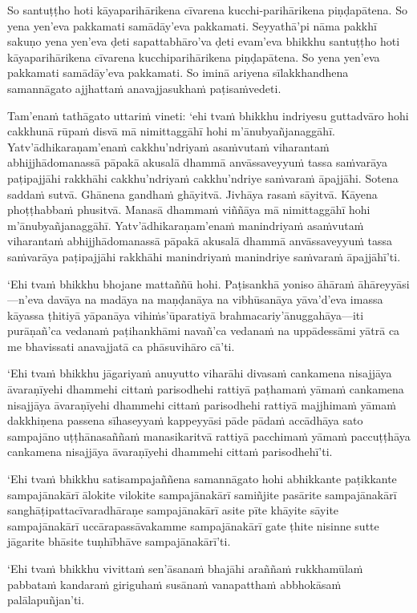 So santuṭṭho hoti kāyaparihārikena cīvarena kucchi-parihārikena piṇḍapātena. So yena yen'eva pakkamati samādāy'eva pakkamati. Seyyathā'pi nāma pakkhī sakuṇo yena yen'eva ḍeti sapattabhāro'va ḍeti evam'eva bhikkhu santuṭṭho hoti kāyaparihārikena cīvarena kucchiparihārikena piṇḍapātena. So yena yen'eva pakkamati samādāy'eva pakkamati. So iminā ariyena sīlakkhandhena samannāgato ajjhattaṁ anavajjasukhaṁ paṭisaṁvedeti.

\suttaRef{[MN 51]}

Tam'enaṁ tathāgato uttariṁ vineti: `ehi tvaṁ bhikkhu indriyesu guttadvāro hohi cakkhunā rūpaṁ disvā mā nimittaggāhī hohi m'ānubyañjanaggāhī. Yatv'ādhikaraṇam'enaṁ cakkhu'ndriyaṁ asaṁvutaṁ viharantaṁ abhijjhādomanassā pāpakā akusalā dhammā anvāssaveyyuṁ tassa saṁvarāya paṭipajjāhi rakkhāhi cakkhu'ndriyaṁ cakkhu'ndriye saṁvaraṁ āpajjāhi. Sotena saddaṁ sutvā. Ghānena gandhaṁ ghāyitvā. Jivhāya rasaṁ sāyitvā. Kāyena phoṭṭhabbaṁ phusitvā. Manasā dhammaṁ viññāya mā nimittaggāhī hohi m'ānubyañjanaggāhī. Yatv'ādhikaraṇam'enaṁ manindriyaṁ asaṁvutaṁ viharantaṁ abhijjhādomanassā pāpakā akusalā dhammā anvāssaveyyuṁ tassa saṁvarāya paṭipajjāhi rakkhāhi manindriyaṁ manindriye saṁvaraṁ āpajjāhī'ti.

`Ehi tvaṁ bhikkhu bhojane mattaññū hohi. Paṭisankhā yoniso āhāraṁ āhāreyyāsi—n'eva davāya na madāya na maṇḍanāya na vibhūsanāya yāva'd'eva imassa kāyassa ṭhitiyā yāpanāya vihiṁs'ūparatiyā brahmacariy'ānuggahāya—iti purāṇañ'ca vedanaṁ paṭihankhāmi navañ'ca vedanaṁ na uppādessāmi yātrā ca me bhavissati anavajjatā ca phāsuvihāro cā'ti.

`Ehi tvaṁ bhikkhu jāgariyaṁ anuyutto viharāhi divasaṁ cankamena nisajjāya āvaraṇīyehi dhammehi cittaṁ parisodhehi rattiyā paṭhamaṁ yāmaṁ cankamena nisajjāya āvaraṇīyehi dhammehi cittaṁ parisodhehi rattiyā majjhimaṁ yāmaṁ dakkhiṇena passena sīhaseyyaṁ kappeyyāsi pāde pādaṁ accādhāya sato sampajāno uṭṭhānasaññaṁ manasikaritvā rattiyā pacchimaṁ yāmaṁ paccuṭṭhāya cankamena nisajjāya āvaraṇīyehi dhammehi cittaṁ parisodhehī'ti.

`Ehi tvaṁ bhikkhu satisampajaññena samannāgato hohi abhikkante paṭikkante sampajānakārī ālokite vilokite sampajānakārī samiñjite pasārite sampajānakārī sanghāṭipattacīvaradhāraṇe sampajānakārī asite pīte khāyite sāyite sampajānakārī uccārapassāvakamme sampajānakārī gate ṭhite nisinne sutte jāgarite bhāsite tuṇhībhāve sampajānakārī'ti.

`Ehi tvaṁ bhikkhu vivittaṁ sen'āsanaṁ bhajāhi araññaṁ rukkhamūlaṁ pabbataṁ kandaraṁ giriguhaṁ susānaṁ vanapatthaṁ abbhokāsaṁ palālapuñjan'ti.

